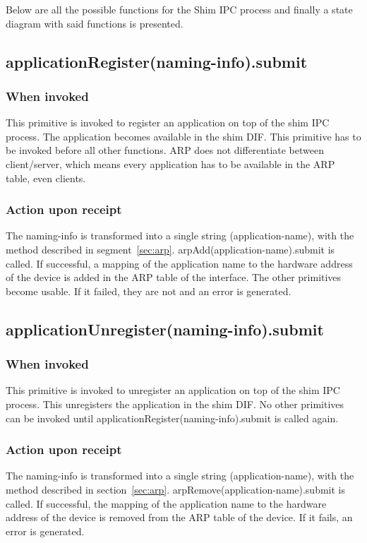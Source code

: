 \npar

Below are all the possible functions for the Shim IPC process and finally a state diagram with said functions is presented.

\subsection{applicationRegister(naming-info).submit}
\subsubsection{When invoked}
This primitive is invoked to register an application on top of the shim IPC process.  The application becomes available in the shim DIF. This primitive has to be invoked before all other functions. ARP does not differentiate between client/server, which means every application has to be available in the ARP table, even clients.
\subsubsection{Action upon receipt}
The naming-info is transformed into a single string (application-name), with the method described in segment~\ref{sec:arp}. arpAdd(application-name).submit is called. If successful, a mapping of the application name to the hardware address of the device is added in the ARP table of the interface. The other primitives become usable. If it failed, they are not and an error is generated.


\subsection{applicationUnregister(naming-info).submit}
\subsubsection{When invoked}
This primitive is invoked to unregister an application on top of the shim IPC process. This unregisters the application in the shim DIF. No other primitives can be invoked until applicationRegister(naming-info).submit is called again. 
\subsubsection{Action upon receipt}
The naming-info is transformed into a single string (application-name), with the method described in section~\ref{sec:arp}. arpRemove(application-name).submit is called. If successful, the mapping of the application name to the hardware address of the device is removed from the ARP table of the device. If it fails, an error is generated.



